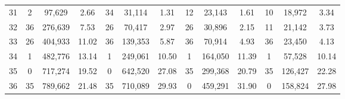 \begin{table}[H]
{\begin{tabular}{c c c c c c c c c c c c c}
       31 & 2  & 97,629 &  2.66 & 34  & 31,114 &  1.31 & 12  & 23,143 &  1.61 & 10  & 18,972 &  3.34 \\ 
       32 & 36  & 276,639 &  7.53 & 26  & 70,417 &  2.97 & 26  & 30,896 &  2.15 & 11  & 21,142 &  3.73 \\ 
       33 & 26  & 404,933 & 11.02 & 36  & 139,353 &  5.87 & 36  & 70,914 &  4.93 & 36  & 23,450 &  4.13 \\ 
       34 & 1  & 482,776 & 13.14 & 1  & 249,061 & 10.50 & 1  & 164,050 & 11.39 & 1  & 57,528 & 10.14 \\ 
       35 & 0  & 717,274 & 19.52 & 0  & 642,520 & 27.08 & 35  & 299,368 & 20.79 & 35  & 126,427 & 22.28 \\ 
       36 & 35  & 789,662 & 21.48 & 35  & 710,089 & 29.93 & 0  & 459,291 & 31.90 & 0  & 158,824 & 27.98 \\ 
      
        \bottomrule
    \end{tabular}
    }
\end{table}
%
%
%
%
%
